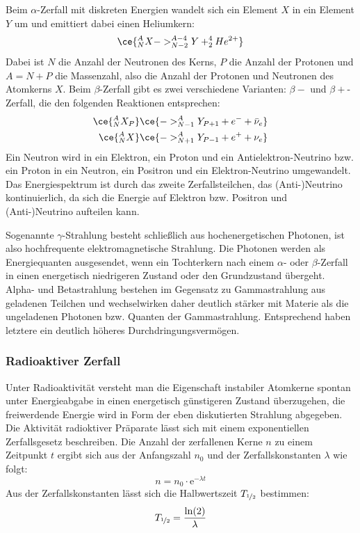 Beim \(\alpha\)-Zerfall mit diskreten Energien wandelt sich ein Element \(X\) in ein Element \(Y\) um und emittiert dabei einen Heliumkern: 
\begin{equation} \label{eq:alpha_decay}
    \ce{^{A}_{N}X -> ^{A-4}_{N-2}Y + ^{4}_{2}He^{2+}}
\end{equation}
Dabei ist \(N\) die Anzahl der Neutronen des Kerns, \(P\) die Anzahl der Protonen und \(A=N+P\) die Massenzahl, also die Anzahl der Protonen und Neutronen des Atomkerns \(X\). Beim \(\beta\)-Zerfall gibt es zwei verschiedene Varianten: \(\beta-\) und \(\beta+\)-Zerfall, die den folgenden Reaktionen entsprechen:
\begin{align}
    \label{eq:beta_minus}
    \ce{^{A}_{N}X_P} &\ce{-> ^{A}_{N-1}Y_{P+1} + e^- + \bar{\nu}_e} \\
    \label{eq:beta_plus}
    \ce{^{A}_{N}X} &\ce{-> ^{A}_{N+1}Y_{P-1} + e^+ + \nu_e}
\end{align}
Ein Neutron wird in ein Elektron, ein Proton und ein Antielektron-Neutrino  bzw. ein Proton in ein Neutron, ein Positron und ein Elektron-Neutrino umgewandelt.
Das Energiespektrum ist durch das zweite Zerfallsteilchen, das (Anti-)Neutrino kontinuierlich, da sich die Energie auf Elektron bzw. Positron und (Anti-)Neutrino aufteilen kann.

Sogenannte \(\gamma\)-Strahlung besteht schließlich aus hochenergetischen Photonen, ist also hochfrequente elektromagnetische Strahlung. Die Photonen werden als Energiequanten ausgesendet, wenn ein Tochterkern nach einem \(\alpha\)- oder \(\beta\)-Zerfall in einen energetisch niedrigeren Zustand oder den Grundzustand übergeht. Alpha- und Betastrahlung bestehen im Gegensatz zu Gammastrahlung aus geladenen Teilchen und wechselwirken daher deutlich stärker mit Materie als die ungeladenen Photonen bzw. Quanten der Gammastrahlung. Entsprechend haben letztere ein deutlich höheres Durchdringungsvermögen.

\subsubsection{Radioaktiver Zerfall} 
Unter Radioaktivität versteht man die Eigenschaft instabiler Atomkerne spontan unter Energieabgabe in einen energetisch günstigeren Zustand überzugehen, die freiwerdende Energie wird in Form der eben diskutierten Strahlung abgegeben. Die Aktivität radioktiver Präparate lässt sich mit einem exponentiellen Zerfallsgesetz beschreiben. Die Anzahl der zerfallenen Kerne \(n\) zu einem Zeitpunkt \(t\) ergibt sich aus der Anfangszahl \(n_0\) und der Zerfallskonstanten \(\lambda\) wie folgt: 
\begin{equation}\label{eq:Zerfallsgesetz}
    n=n_0\cdot \mathrm{e}^{-\lambda t}
\end{equation}
Aus der Zerfallskonstanten lässt sich die Halbwertszeit \(T_{\nicefrac{1}{2}}\) bestimmen:
\begin{equation}\label{eq:Halbwertszeit}
    T_{\nicefrac{1}{2}}=\frac{\ln(2)}{\lambda}
\end{equation}

